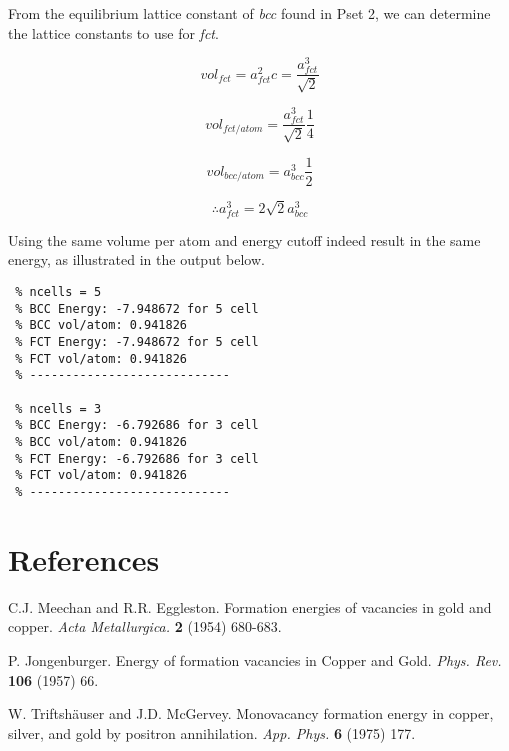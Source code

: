 \documentclass[12pt, oneside]{article}
\begin{document}
From the equilibrium lattice constant of \textit{bcc} found in Pset 2, we can determine the lattice constants to use for \textit{fct}. 

\begin{equation}
 vol_{fct} = a_{fct}^2 c = \frac{a_{fct}^3}{\sqrt{2}}
\end{equation}

\begin{equation}
 vol_{fct/atom} = \frac{a_{fct}^3}{\sqrt{2}} \frac{1}{4}
\end{equation}

\begin{equation}
  vol_{bcc/atom} = a_{bcc}^3 \frac{1}{2}
\end{equation}

\begin{equation}
  \therefore a_{fct}^3 = 2\sqrt{2} a_{bcc}^3
\end{equation}

Using the same volume per atom and energy cutoff indeed result in the same energy, as illustrated in the output below.

\begin{verbatim}
 % ncells = 5
 % BCC Energy: -7.948672 for 5 cell 
 % BCC vol/atom: 0.941826 
 % FCT Energy: -7.948672 for 5 cell 
 % FCT vol/atom: 0.941826 
 % ----------------------------
 
 % ncells = 3
 % BCC Energy: -6.792686 for 3 cell 
 % BCC vol/atom: 0.941826 
 % FCT Energy: -6.792686 for 3 cell 
 % FCT vol/atom: 0.941826 
 % ----------------------------
\end{verbatim}

\section{References}

\noindent C.J. Meechan and R.R. Eggleston. Formation energies of vacancies in gold and copper. \textit{Acta Metallurgica.} \textbf{2} (1954) 680-683.

\hfill

\noindent P. Jongenburger. Energy of formation vacancies in Copper and Gold. \textit{Phys. Rev.} \textbf{106} (1957) 66.

\hfill

\noindent W. Triftsh{\"a}user and J.D. McGervey. Monovacancy formation energy in copper, silver, and gold by positron annihilation. \textit{App. Phys.} \textbf{6} (1975) 177.
\end{document}
